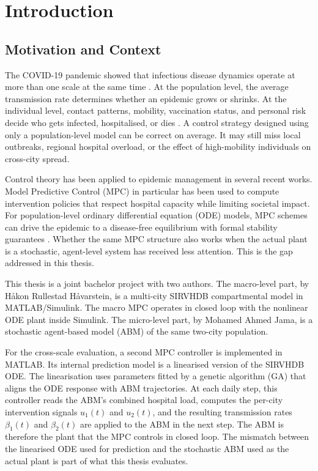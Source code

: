 

\chapter{Introduction}
\label{ch:intro}

\section{Motivation and Context}
\label{sec:motivation}

The COVID-19 pandemic showed that infectious disease dynamics operate at more than one scale at the same time \citep{dong2022,mathieu2020}.
At the population level, the average transmission rate determines whether an epidemic grows or shrinks.
At the individual level, contact patterns, mobility, vaccination status, and personal risk decide who gets infected, hospitalised, or dies \citep{zhang2021}.
A control strategy designed using only a population-level model can be correct on average.
It may still miss local outbreaks, regional hospital overload, or the effect of high-mobility individuals on cross-city spread.

Control theory has been applied to epidemic management in several recent works.
Model Predictive Control (MPC) in particular has been used to compute intervention policies that respect hospital capacity while limiting societal impact.
For population-level ordinary differential equation (ODE) models, MPC schemes can drive the epidemic to a disease-free equilibrium with formal stability guarantees \citep{esterhuizen2024}.
Whether the same MPC structure also works when the actual plant is a stochastic, agent-level system has received less attention.
This is the gap addressed in this thesis.

This thesis is a joint bachelor project with two authors.
The macro-level part, by H\aa{}kon Rullestad H\aa{}varstein, is a multi-city SIRVHDB compartmental model in MATLAB/Simulink.
The macro MPC operates in closed loop with the nonlinear ODE plant inside Simulink.
The micro-level part, by Mohamed Ahmed Jama, is a stochastic agent-based model (ABM) of the same two-city population.

For the cross-scale evaluation, a second MPC controller is implemented in MATLAB.
Its internal prediction model is a linearised version of the SIRVHDB ODE.
The linearisation uses parameters fitted by a genetic algorithm (GA) that aligns the ODE response with ABM trajectories.
At each daily step, this controller reads the ABM's combined hospital load, computes the per-city intervention signals $u_1(t)$ and $u_2(t)$, and the resulting transmission rates $\beta_1(t)$ and $\beta_2(t)$ are applied to the ABM in the next step.
The ABM is therefore the plant that the MPC controls in closed loop.
The mismatch between the linearised ODE used for prediction and the stochastic ABM used as the actual plant is part of what this thesis evaluates.

